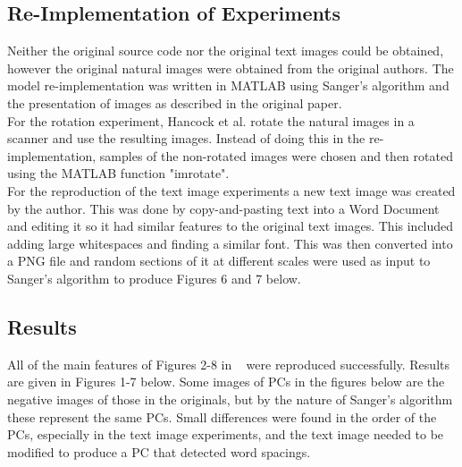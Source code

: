 \subsection{Re-Implementation of Experiments}

Neither the original source code nor the original text images could be obtained, however the original natural images were obtained from the original authors. The model re-implementation was written in MATLAB using Sanger's algorithm and the presentation of images as described in the original paper.\\
For the rotation experiment, Hancock et al. rotate the natural images in a scanner and use the resulting images. Instead of doing this in the re-implementation, samples of the non-rotated images were chosen and then rotated using the MATLAB function "imrotate".\\
For the reproduction of the text image experiments a new text image was created by the author. This was done by copy-and-pasting text into a Word Document and editing it so it had similar features to the original text images. This included adding large whitespaces and finding a similar font. This was then converted into a PNG file and random sections of it at different scales were used as input to Sanger's algorithm to produce Figures 6 and 7 below. 

\subsection{Results}
All of the main features of Figures 2-8 in ~\cite{Hancock} were reproduced successfully. Results are given in Figures 1-7 below. Some images of PCs in the figures below are the negative images of those in the originals, but by the nature of Sanger's algorithm these represent the same PCs. Small differences were found in the order of the PCs, especially in the text image experiments, and the text image needed to be modified to produce a PC that detected word spacings.
 

